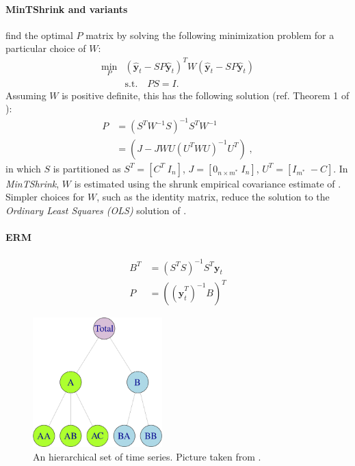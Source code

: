 \documentclass{article}
\begin{document}
  \paragraph{MinTShrink and variants} \citet{wickramasuriya_optimal_2019} find the optimal \(P\) matrix by solving the following minimization problem for a particular choice of \(W\):
  \begin{align}
    \min_P &(\hat{\textbf{y}}_{t} - SP\hat{\textbf{y}}_{t})^T W (\hat{\textbf{y}}_{t} - SP\hat{\textbf{y}}_{t}) \nonumber \\
    & \text{s.t.} \quad PS=I.
  \end{align}
  Assuming \(W\) is positive definite, this has the following solution (ref. Theorem 1 of \cite{wickramasuriya_optimal_2019}):
  \begin{align} 
    P &= (S^TW^{-1}S)^{-1}S^TW^{-1} \nonumber \\
      &= (J - JWU(U^TWU)^{-1}U^T) \;, \label{eq:p1}
  \end{align}
  in which \(S\) is partitioned as \(S^T = [C^T \; I_n]\), \(J = [0_{n \times m^*} \; I_n]\), \(U^T = [I_{m^*} \; -C]\). In \textit{MinTShrink}, \(W\) is estimated using the shrunk empirical covariance estimate of \cite{schafer_shrinkage_2005}. Simpler choices for \(W\), such as the identity matrix, reduce the solution to the \textit{Ordinary Least Squares (OLS)} solution of \cite{hyndman_optimal_2011}.

  \paragraph{ERM} \citet{bentaieb_regularized_2019} 
  \begin{align} 
    B^T &= (S^TS)^{-1}S^T\textbf{y}_{t} \\
    P   &= ((\hat{\textbf{y}}_{t}^T)^{-1} B)^T
  \end{align}

  \begin{figure}[t]
    \centering
    \includegraphics[height=5cm]{./assets/hts.png}
    \caption{An hierarchical set of time series. Picture taken from \cite{hyndman_forecasting_2021}.}
    \label{fig:hts}
  \end{figure}
\end{document}
